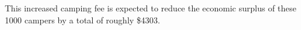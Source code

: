 \documentclass[11pt,letterpaper]{article}\usepackage[]{graphicx}\usepackage[]{color}
\begin{document}
\begin{enumerate}[label=\alph*., leftmargin=*]
\begin{enumerate}[label=\roman*.]
		This increased camping fee is expected to reduce the economic surplus of these 1000 campers by a total of roughly \$4303.
	\end{enumerate}
\end{enumerate}
\end{document}
